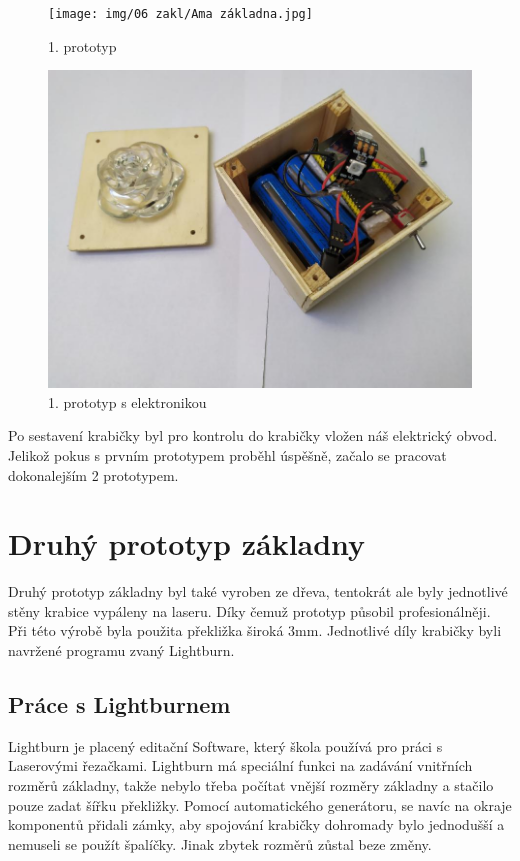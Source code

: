 \begin{figure}[htbp]
	\centering
	\begin{minipage}[b]{0.5\textwidth}
		\centering
		\texttt{[image: img/06 zakl/Ama základna.jpg]}
		\caption{1. prototyp}
	\end{minipage}
	\qquad
	\begin{minipage}[b]{0.4\textwidth}
		\centering
		\includegraphics[width=1\textwidth]{img/06 zakl/1. prototyp s ele.jpg}
		\caption{1. prototyp s elektronikou}
	\end{minipage}
\end{figure}

Po sestavení krabičky byl pro kontrolu do krabičky vložen náš elektrický obvod.
Jelikož pokus s prvním prototypem proběhl úspěšně, začalo se pracovat dokonalejším 2 prototypem.


\section{Druhý prototyp základny }
Druhý prototyp základny byl také vyroben ze dřeva, tentokrát ale byly jednotlivé stěny krabice vypáleny na laseru. Díky čemuž prototyp působil profesionálněji. Při této výrobě byla použita překližka široká 3mm. Jednotlivé díly krabičky byli navržené programu zvaný Lightburn.

\subsection{Práce s Lightburnem}
Lightburn je placený editační Software, který škola používá pro práci s Laserovými řezačkami.  Lightburn má speciální funkci na zadávání vnitřních rozměrů základny, takže nebylo třeba počítat vnější rozměry základny a stačilo pouze zadat šířku překližky. Pomocí automatického generátoru, se navíc na okraje komponentů přidali zámky, aby spojování krabičky dohromady bylo jednodušší a nemuseli se použít špalíčky. Jinak zbytek rozměrů zůstal beze změny.

